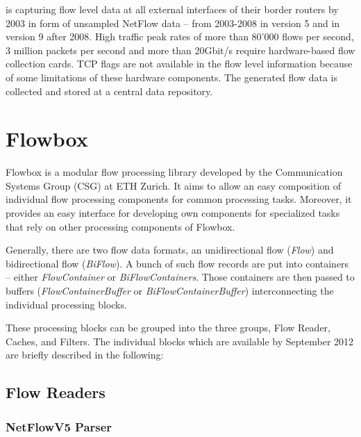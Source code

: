 \citet{switch} is capturing flow level data at all external interfaces of their border routers by 2003 in form of unsampled NetFlow data -- from 2003-2008 in version 5 and in version 9 after 2008\citep{Schatzmann:Tracing}.
High traffic peak rates of more than 80'000 flows per second, 3 million packets per second and more than 20Gbit/s require hardware-based flow collection cards. TCP flags are not available in the flow level information because of some limitations of these hardware components. The generated flow data is collected and stored at a central data repository.

\section{Flowbox
\label{section:flowbox}}

Flowbox is a modular flow processing library developed by the Communication Systems Group (CSG) at ETH Zurich. It aims to allow an easy composition of individual flow processing components for common processing tasks. Moreover, it provides an easy interface for developing own components for specialized tasks that rely on other processing components of Flowbox.

Generally, there are two flow data formats, an unidirectional flow (\emph{Flow}) and bidirectional flow (\emph{BiFlow}). A bunch of such flow records are put into containers -- either \emph{FlowContainer} or \emph{BiFlowContainers}. Those containers are then passed to buffers (\emph{FlowContainerBuffer} or \emph{BiFlowContainerBuffer}) interconnecting the individual processing blocks.

These processing blocks can be grouped into the three groups, Flow Reader, Caches, and Filters. The individual blocks which are available by September 2012 are briefly described in the following:

\subsection{Flow Readers}

\subsubsection{NetFlowV5 Parser} 
